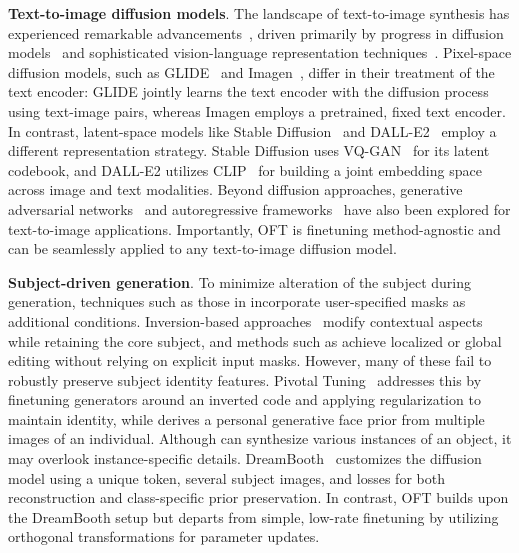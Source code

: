\textbf{Text-to-image diffusion models}. The landscape of text-to-image synthesis has experienced remarkable advancements~\cite{saharia2022photorealistic,ramesh2022hierarchical,rombach2022high,gu2022vector,nichol2022glide}, driven primarily by progress in diffusion models~\cite{ho2020denoising,song2021score,song2021denoising,dhariwal2021diffusion} and sophisticated vision-language representation techniques~\cite{su2020vlbert,lu2019vilbert,radford2021learning,wang2021simvlm,li2022blip,li2023blip,alayrac2022flamingo,schuhmann2022laion}. Pixel-space diffusion models, such as GLIDE~\cite{nichol2022glide} and Imagen~\cite{saharia2022photorealistic}, differ in their treatment of the text encoder: GLIDE jointly learns the text encoder with the diffusion process using text-image pairs, whereas Imagen employs a pretrained, fixed text encoder. In contrast, latent-space models like Stable Diffusion~\cite{rombach2022high} and DALL-E2~\cite{ramesh2022hierarchical} employ a different representation strategy. Stable Diffusion uses VQ-GAN~\cite{esser2021taming} for its latent codebook, and DALL-E2 utilizes CLIP~\cite{radford2021learning} for building a joint embedding space across image and text modalities. Beyond diffusion approaches, generative adversarial networks~\cite{reed2016generative,zhang2017stackgan,xu2018attngan,li2019controllable} and autoregressive frameworks~\cite{ramesh2021zero,ding2021cogview,wu2022nuwa,yuscaling} have also been explored for text-to-image applications. Importantly, OFT is finetuning method-agnostic and can be seamlessly applied to any text-to-image diffusion model.

\textbf{Subject-driven generation}. To minimize alteration of the subject during generation, techniques such as those in \cite{avrahami2022blended,nichol2022glide} incorporate user-specified masks as additional conditions. Inversion-based approaches~\cite{choi2021ilvr,dhariwal2021diffusion,ramesh2022hierarchical,gal2022image} modify contextual aspects while retaining the core subject, and methods such as \cite{hertz2022prompt} achieve localized or global editing without relying on explicit input masks. However, many of these fail to robustly preserve subject identity features. Pivotal Tuning~\cite{roich2022pivotal} addresses this by finetuning generators around an inverted code and applying regularization to maintain identity, while \cite{nitzan2022mystyle} derives a personal generative face prior from multiple images of an individual. Although \cite{casanova2021instance} can synthesize various instances of an object, it may overlook instance-specific details. DreamBooth~\cite{ruiz2023dreambooth} customizes the diffusion model using a unique token, several subject images, and losses for both reconstruction and class-specific prior preservation. In contrast, OFT builds upon the DreamBooth setup but departs from simple, low-rate finetuning by utilizing orthogonal transformations for parameter updates.

